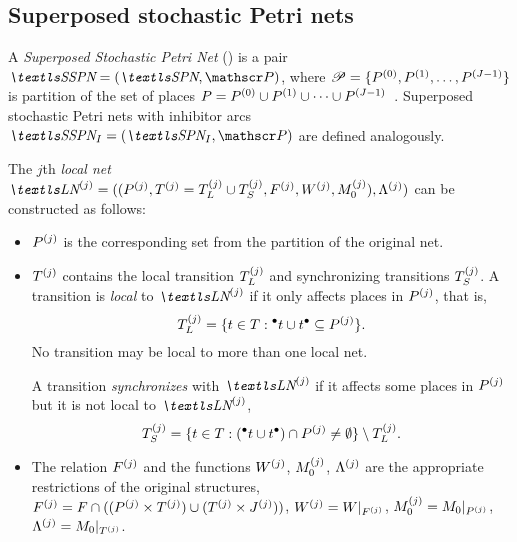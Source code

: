 \subsection{Superposed stochastic Petri nets}

\begin{dfn}
  A \emph{Superposed Stochastic Petri Net} () is a pair
  $\SSPN = (\SPN, \partitions)$, where
  $\mathscr{P} = \{ P^{(0)}, P^{(1)}, \ldots, P^{(J - 1)} \}$
  is partition of the set of places
  $P = P^{(0)} \cup P^{(1)} \cup \cdots \cup P^{(J -
    1)}$~\citep{DBLP:conf/apn/Donatelli94}.
  Superposed stochastic Petri nets with inhibitor arcs
  $\SSPN_I = (\SPN_I, \partitions)$ are defined analogously.
\end{dfn}

The $j$th \emph{local net}
$\LN{j} = ((\loc{P}{j}, \loc{T}{j} = \loc{T_L}{j} \cup \loc{T_S}{j},
\loc{F}{j}, \loc{W}{j}, \loc{M_0}{j}), \loc{\Lambda}{j})$
can be constructed as follows:
\begin{itemize}
\item $P^{(j)}$ is the corresponding set from the partition of the
  original net.
\item $T^{(j)}$ contains the local transition $T_L^{(j)}$ and
  synchronizing transitions $T_S^{(j)}$. A transition is
  \emph{local} to $\LN{j}$ if it only affects places in $P^{(j)}$,
  that is,
  \begin{equation}
    \label{eq:background:sspn:localtran}
    T_L^{(j)} = \{ t \in T : \prescript{\bullet}{}{t} \cup t^\bullet \subseteq
    P^{(j)} \} \text.
  \end{equation}
  No transition may be local to more than one local net.

  A transition \emph{synchronizes} with $\LN{j}$ if it affects some
  places in $P^{(j)}$ but it is not local to $\LN{j}$,
  \begin{equation}
    \label{eq:background:sspn:synctran}
    T_S^{(j)} = \{ t \in T : (\prescript{\bullet}{}{t} \cup t^\bullet) \cap
    P^{(j)} \ne \emptyset \} \setminus T_L^{(j)} \text.
  \end{equation}
\item The relation $F^{(j)}$ and the functions $W^{(j)}$,
  $M_0^{(j)}$, $\Lambda^{(j)}$ are the appropriate restrictions
  of the original structures,
  $F^{(j)} = F \cap ((P^{(j)} \times T^{(j)}) \cup
  (T^{(j)} \times J^{(j)}))$, $W^{(j)} = W |_{F^{(j)}}$,
  $M_0^{(j)} = M_0 |_{P^{(j)}}$, $\Lambda^{(j)} = M_0 |_{T^{(j)}}$.
\end{itemize}

